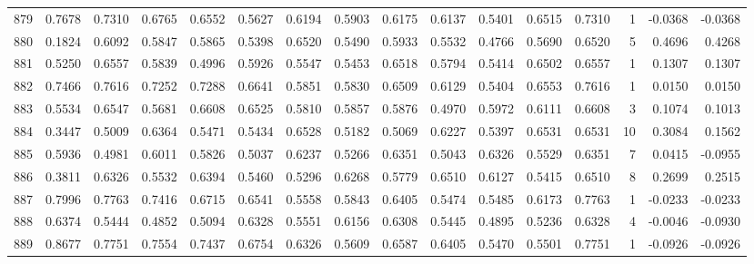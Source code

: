 \begin{tabular}{lrrrrrrrrrrrrrrr}
879 &      0.7678 &  0.7310 &  0.6765 &  0.6552 &  0.5627 &  0.6194 &  0.5903 &  0.6175 &  0.6137 &  0.5401 &   0.6515 &     0.7310 &      1 &                   -0.0368 &                    -0.0368 \\
880 &      0.1824 &  0.6092 &  0.5847 &  0.5865 &  0.5398 &  0.6520 &  0.5490 &  0.5933 &  0.5532 &  0.4766 &   0.5690 &     0.6520 &      5 &                    0.4696 &                     0.4268 \\
881 &      0.5250 &  0.6557 &  0.5839 &  0.4996 &  0.5926 &  0.5547 &  0.5453 &  0.6518 &  0.5794 &  0.5414 &   0.6502 &     0.6557 &      1 &                    0.1307 &                     0.1307 \\
882 &      0.7466 &  0.7616 &  0.7252 &  0.7288 &  0.6641 &  0.5851 &  0.5830 &  0.6509 &  0.6129 &  0.5404 &   0.6553 &     0.7616 &      1 &                    0.0150 &                     0.0150 \\
883 &      0.5534 &  0.6547 &  0.5681 &  0.6608 &  0.6525 &  0.5810 &  0.5857 &  0.5876 &  0.4970 &  0.5972 &   0.6111 &     0.6608 &      3 &                    0.1074 &                     0.1013 \\
884 &      0.3447 &  0.5009 &  0.6364 &  0.5471 &  0.5434 &  0.6528 &  0.5182 &  0.5069 &  0.6227 &  0.5397 &   0.6531 &     0.6531 &     10 &                    0.3084 &                     0.1562 \\
885 &      0.5936 &  0.4981 &  0.6011 &  0.5826 &  0.5037 &  0.6237 &  0.5266 &  0.6351 &  0.5043 &  0.6326 &   0.5529 &     0.6351 &      7 &                    0.0415 &                    -0.0955 \\
886 &      0.3811 &  0.6326 &  0.5532 &  0.6394 &  0.5460 &  0.5296 &  0.6268 &  0.5779 &  0.6510 &  0.6127 &   0.5415 &     0.6510 &      8 &                    0.2699 &                     0.2515 \\
887 &      0.7996 &  0.7763 &  0.7416 &  0.6715 &  0.6541 &  0.5558 &  0.5843 &  0.6405 &  0.5474 &  0.5485 &   0.6173 &     0.7763 &      1 &                   -0.0233 &                    -0.0233 \\
888 &      0.6374 &  0.5444 &  0.4852 &  0.5094 &  0.6328 &  0.5551 &  0.6156 &  0.6308 &  0.5445 &  0.4895 &   0.5236 &     0.6328 &      4 &                   -0.0046 &                    -0.0930 \\
889 &      0.8677 &  0.7751 &  0.7554 &  0.7437 &  0.6754 &  0.6326 &  0.5609 &  0.6587 &  0.6405 &  0.5470 &   0.5501 &     0.7751 &      1 &                   -0.0926 &                    -0.0926 \\

\end{tabular}

